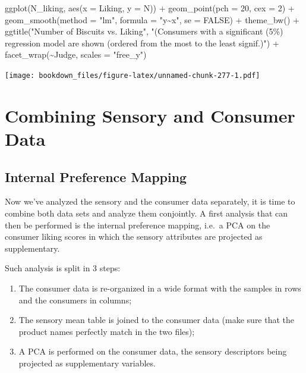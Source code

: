 \documentclass[
]{krantz}
\makeatletter
\newenvironment{Shaded}{\begin{snugshade}}{\end{snugshade}}
\newcommand{\AttributeTok}[1]{\textcolor[rgb]{0.61,0.61,0.61}{#1}}
\newcommand{\ConstantTok}[1]{\textcolor[rgb]{0,0,0}{#1}}
\newcommand{\DecValTok}[1]{\textcolor[rgb]{0.06,0.06,0.06}{#1}}
\newcommand{\FunctionTok}[1]{\textcolor[rgb]{0,0,0}{#1}}
\newcommand{\NormalTok}[1]{#1}
\newcommand{\SpecialCharTok}[1]{\textcolor[rgb]{0,0,0}{#1}}
\newcommand{\StringTok}[1]{\textcolor[rgb]{0.5,0.5,0.5}{#1}}
\providecommand{\tightlist}{%
  \setlength{\itemsep}{0pt}\setlength{\parskip}{0pt}}
\newenvironment{kframe}{%
\medskip{}
\setlength{\fboxsep}{.8em}
 \def\at@end@of@kframe{}%
 \ifinner\ifhmode%
  \def\at@end@of@kframe{\end{minipage}}%
  \begin{minipage}{\columnwidth}%
 \fi\fi%
 \def\FrameCommand##1{\hskip\@totalleftmargin \hskip-\fboxsep
 \colorbox{shadecolor}{##1}\hskip-\fboxsep
     \hskip-\linewidth \hskip-\@totalleftmargin \hskip\columnwidth}%
 \MakeFramed {\advance\hsize-\width
   \@totalleftmargin\z@ \linewidth\hsize
   \@setminipage}}%
 {\par\unskip\endMakeFramed%
 \at@end@of@kframe}
\renewenvironment{Shaded}{\begin{kframe}}{\end{kframe}}
\makeatother
\begin{document}
\begin{Shaded}
\begin{Highlighting}[]
\FunctionTok{ggplot}\NormalTok{(N\_liking, }\FunctionTok{aes}\NormalTok{(}\AttributeTok{x =}\NormalTok{ Liking, }\AttributeTok{y =}\NormalTok{ N)) }\SpecialCharTok{+}
  \FunctionTok{geom\_point}\NormalTok{(}\AttributeTok{pch =} \DecValTok{20}\NormalTok{, }\AttributeTok{cex =} \DecValTok{2}\NormalTok{) }\SpecialCharTok{+}
  \FunctionTok{geom\_smooth}\NormalTok{(}\AttributeTok{method =} \StringTok{"lm"}\NormalTok{, }\AttributeTok{formula =} \StringTok{"y\textasciitilde{}x"}\NormalTok{, }\AttributeTok{se =} \ConstantTok{FALSE}\NormalTok{) }\SpecialCharTok{+}
  \FunctionTok{theme\_bw}\NormalTok{() }\SpecialCharTok{+}
  \FunctionTok{ggtitle}\NormalTok{(}\StringTok{"Number of Biscuits vs. Liking"}\NormalTok{, }\StringTok{"(Consumers with a significant (5\%) regression model are shown (ordered from the most to the least signif.)"}\NormalTok{) }\SpecialCharTok{+}
  \FunctionTok{facet\_wrap}\NormalTok{(}\SpecialCharTok{\textasciitilde{}}\NormalTok{Judge, }\AttributeTok{scales =} \StringTok{"free\_y"}\NormalTok{)}
\end{Highlighting}
\end{Shaded}

\texttt{[image: bookdown\_files/figure-latex/unnamed-chunk-277-1.pdf]}

\hypertarget{combining-sensory-and-consumer-data}{%
\section{Combining Sensory and Consumer Data}\label{combining-sensory-and-consumer-data}}

\hypertarget{internal-preference-mapping}{%
\subsection{Internal Preference Mapping}\label{internal-preference-mapping}}

Now we've analyzed the sensory and the consumer data separately, it is time to combine both data sets and analyze them conjointly. A first analysis that can then be performed is the internal preference mapping, i.e.~a PCA on the consumer liking scores in which the sensory attributes are projected as supplementary.

Such analysis is split in 3 steps:

\begin{enumerate}
\def\labelenumi{\arabic{enumi}.}
\tightlist
\item
  The consumer data is re-organized in a wide format with the samples in rows and the consumers in columns;
\item
  The sensory mean table is joined to the consumer data (make sure that the product names perfectly match in the two files);
\item
  A PCA is performed on the consumer data, the sensory descriptors being projected as supplementary variables.
\end{enumerate}
\end{document}
